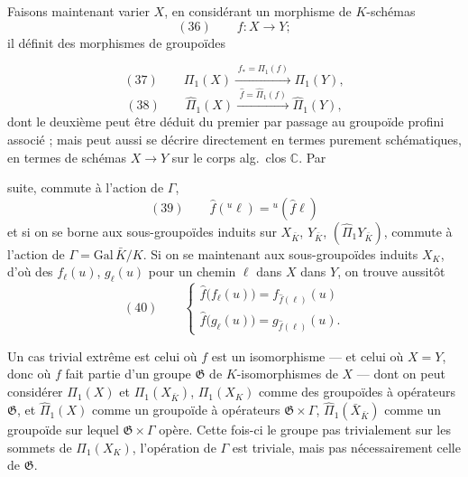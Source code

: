 \documentclass[11pt,a4paper]{article}
\begin{document}
Faisons maintenant varier $X$, en \struck{\ill{}} considérant un morphisme de $K$-schémas
\[
  (36) \qquad f : X \to Y ;
\]
il définit des morphismes de groupoïdes

\[
  (37) \qquad \Pi_1(X) \xrightarrow{\; f_{*} = \Pi_1(f) \;} \Pi_1(Y),
\]
\[
  (38) \qquad \hat{\Pi}_1(X) \xrightarrow{\; \hat{f} = \hat{\Pi}_1(f) \;} \hat{\Pi}_1(Y),
\]
dont le deuxième peut être déduit du premier par passage au groupoïde profini associé ; mais peut aussi se décrire directement en termes purement schématiques, en termes  de schémas \ill{} $X \to Y$ sur le corps alg.\ clos $\mathbb{C}$. Par

suite,  commute à l'action de $\Gamma$,
\[
  (39) \qquad \hat{f}({}^{u}\ell) = {}^{u}(\hat{f}\ell)
\]
et si on se borne aux sous-groupoïdes induits sur $X_{\bar K}$, $Y_{\bar K}$,  $(\hat{\Pi}_1 Y_{\bar K})$,  commute à l'action de \ill{} $\Gamma = \mathrm{Gal}\, \bar{K}/K$. Si on se  maintenant aux sous-groupoïdes induits \ill{} $X_K$, d'où des $f_{\ell}(u)$, $g_{\ell}(u)$ pour un chemin $\ell$ dans $X$ \ill{} dans $Y$, on trouve aussitôt
\[
  (40) \qquad
  \begin{cases}
    \hat{f}\bigl(f_{\ell}(u)\bigr) = f_{\hat{f}(\ell)}(u) \\
    \hat{f}\bigl(g_{\ell}(u)\bigr) = g_{\hat{f}(\ell)}(u) .
  \end{cases}
\]


Un cas trivial extrême est celui où $f$ est un isomorphisme --- et  celui où $X = Y$, donc où $f$ fait partie d'un groupe $\mathfrak{G}$ de $K$-isomorphismes de $X$ --- dont on peut considérer $\Pi_1(X)$ et $\Pi_1(X_{\bar K})$, $\Pi_1(X_K)$ comme des groupoïdes à opérateurs $\mathfrak{G}$, et $\hat{\Pi}_1(X)$ comme un groupoïde à opérateurs $\mathfrak{G} \times \Gamma$, $\hat{\Pi}_1(\bar{X}_{\bar K})$ comme un groupoïde \struck{\ill{}} sur lequel $\mathfrak{G} \times \Gamma$ opère. Cette fois-ci le groupe  pas trivialement sur les sommets de $\Pi_1(X_K)$, l'opération de $\Gamma$ est triviale, mais pas nécessairement celle de $\mathfrak{G}$.
\end{document}
